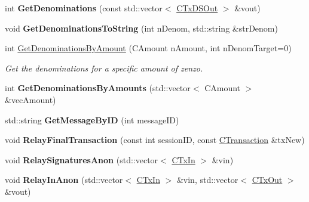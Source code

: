 \begin{DoxyCompactItemize}
int {\bfseries Get\+Denominations} (const std\+::vector$<$ \mbox{\hyperlink{class_c_tx_d_s_out}{C\+Tx\+D\+S\+Out}} $>$ \&vout)
\item 
\mbox{\label{class_c_obfuscation_pool_a09e08db03e7171cbf7d6058243540760}} 
void {\bfseries Get\+Denominations\+To\+String} (int n\+Denom, std\+::string \&str\+Denom)
\item 
\mbox{\label{class_c_obfuscation_pool_a1497a31a5b0ed7378282e23db3481da9}} 
int \mbox{\hyperlink{class_c_obfuscation_pool_a1497a31a5b0ed7378282e23db3481da9}{Get\+Denominations\+By\+Amount}} (C\+Amount n\+Amount, int n\+Denom\+Target=0)
\begin{DoxyCompactList}\small\item\em Get the denominations for a specific amount of zenzo. \end{DoxyCompactList}\item 
\mbox{\label{class_c_obfuscation_pool_a25107ff0bd9a447723d165aa5b53a036}} 
int {\bfseries Get\+Denominations\+By\+Amounts} (std\+::vector$<$ C\+Amount $>$ \&vec\+Amount)
\item 
\mbox{\label{class_c_obfuscation_pool_a4f9ec32ab5edd5e3718cd30e71712668}} 
std\+::string {\bfseries Get\+Message\+By\+ID} (int message\+ID)
\item 
\mbox{\label{class_c_obfuscation_pool_ad4e4c2c2ee843c824b3534a47e26cead}} 
void {\bfseries Relay\+Final\+Transaction} (const int session\+ID, const \mbox{\hyperlink{class_c_transaction}{C\+Transaction}} \&tx\+New)
\item 
\mbox{\label{class_c_obfuscation_pool_a3da993b552c5bcdeebde27fa12ad9f4c}} 
void {\bfseries Relay\+Signatures\+Anon} (std\+::vector$<$ \mbox{\hyperlink{class_c_tx_in}{C\+Tx\+In}} $>$ \&vin)
\item 
\mbox{\label{class_c_obfuscation_pool_a126aeec2c18f115b69479878833175e9}} 
void {\bfseries Relay\+In\+Anon} (std\+::vector$<$ \mbox{\hyperlink{class_c_tx_in}{C\+Tx\+In}} $>$ \&vin, std\+::vector$<$ \mbox{\hyperlink{class_c_tx_out}{C\+Tx\+Out}} $>$ \&vout)
\item 

\end{DoxyCompactItemize}
